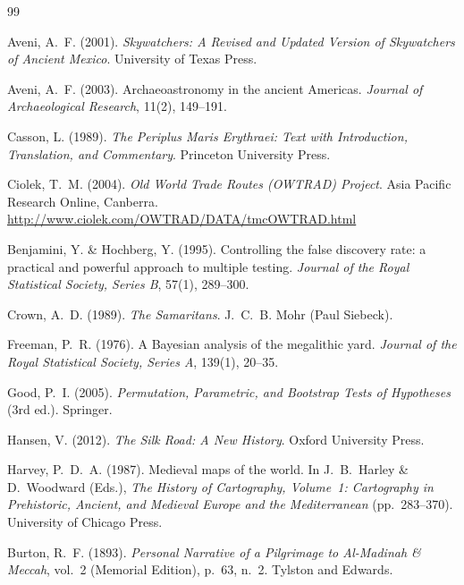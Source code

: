 \begin{thebibliography}{99}

Aveni, A.~F. (2001).
\textit{Skywatchers: A Revised and Updated Version of Skywatchers of
Ancient Mexico}.
University of Texas Press.

Aveni, A.~F. (2003).
Archaeoastronomy in the ancient Americas.
\textit{Journal of Archaeological Research}, 11(2), 149--191.

Casson, L. (1989).
\textit{The Periplus Maris Erythraei: Text with Introduction, Translation,
and Commentary}.
Princeton University Press.

Ciolek, T.~M. (2004).
\textit{Old World Trade Routes (OWTRAD) Project}.
Asia Pacific Research Online, Canberra.
\url{http://www.ciolek.com/OWTRAD/DATA/tmcOWTRAD.html}

Benjamini, Y. \& Hochberg, Y. (1995).
Controlling the false discovery rate: a practical and powerful approach
to multiple testing.
\textit{Journal of the Royal Statistical Society, Series B}, 57(1), 289--300.

Crown, A.~D. (1989).
\textit{The Samaritans}.
J.~C.~B. Mohr (Paul Siebeck).

Freeman, P.~R. (1976).
A Bayesian analysis of the megalithic yard.
\textit{Journal of the Royal Statistical Society, Series A}, 139(1), 20--35.

Good, P.~I. (2005).
\textit{Permutation, Parametric, and Bootstrap Tests of Hypotheses}
(3rd ed.).
Springer.

Hansen, V. (2012).
\textit{The Silk Road: A New History}.
Oxford University Press.

Harvey, P.~D.~A. (1987).
Medieval maps of the world.
In J.~B.~Harley \& D.~Woodward (Eds.),
\textit{The History of Cartography, Volume~1:
Cartography in Prehistoric, Ancient, and Medieval Europe
and the Mediterranean} (pp.~283--370).
University of Chicago Press.

Burton, R.~F. (1893).
\textit{Personal Narrative of a Pilgrimage to Al-Madinah \& Meccah},
vol.~2 (Memorial Edition), p.~63, n.~2.
Tylston and Edwards.


\end{thebibliography}
